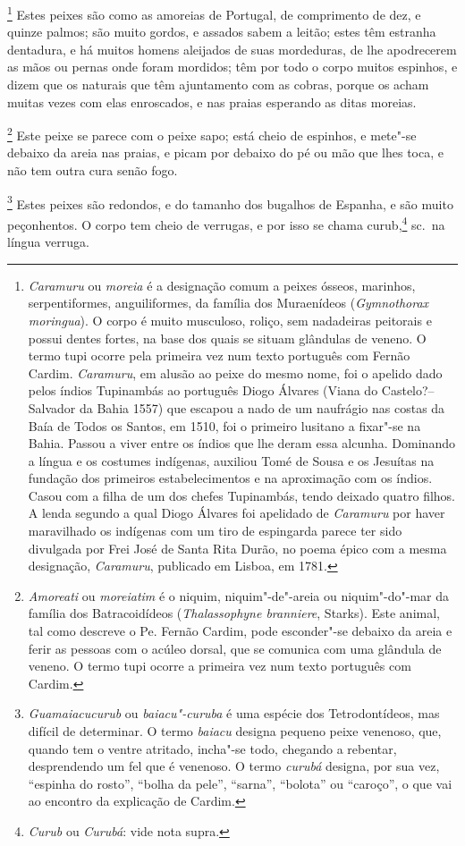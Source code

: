 \footnote{ \textit{Caramuru} ou \textit{moreia} é a
designação comum a peixes ósseos, marinhos, serpentiformes,
anguiliformes, da família dos Muraenídeos (\textit{Gymnothorax
moringua}). O corpo é muito musculoso, roliço, sem nadadeiras peitorais
e possui dentes fortes, na base dos quais se situam glândulas de
veneno. O termo tupi ocorre pela primeira vez num texto português com
Fernão Cardim. \textit{Caramuru}, em alusão ao peixe do mesmo nome, foi
o apelido dado pelos índios Tupinambás ao português Diogo Álvares (Viana
do Castelo?--Salvador da Bahia 1557) que escapou a nado de um
naufrágio nas costas da Baía de Todos os Santos, em 1510, foi o
primeiro lusitano a fixar"-se na Bahia. Passou a viver entre os índios
que lhe deram essa alcunha. Dominando a língua e os costumes indígenas,
auxiliou Tomé de Sousa e os Jesuítas na fundação dos primeiros
estabelecimentos e na aproximação com os índios. Casou com a filha de
um dos chefes Tupinambás, tendo deixado quatro filhos. A lenda segundo a
qual Diogo Álvares foi apelidado de \textit{Caramuru} por haver
maravilhado os indígenas com um tiro de espingarda parece ter sido
divulgada por Frei José de Santa Rita Durão, no poema épico com a mesma
designação, \textit{Caramuru}, publicado em Lisboa, em 1781.} 
Estes peixes são como as amoreias de Portugal, de comprimento de dez,
e quinze palmos; são muito gordos, e assados sabem a leitão; estes têm
estranha dentadura, e há muitos homens aleijados de suas mordeduras, de
lhe apodrecerem as mãos ou pernas onde foram mordidos; têm por todo o
corpo muitos espinhos, e dizem que os naturais que têm ajuntamento com
as cobras, porque os acham muitas vezes com elas enroscados, e nas
praias esperando as ditas moreias.

\footnote{ \textit{Amoreati} ou \textit{moreiatim} 
é o niquim, niquim"-de"-areia ou niquim"-do"-mar da família dos
Batracoidídeos (\textit{Thalassophyne branniere}, Starks). Este animal,
tal como descreve o Pe. Fernão Cardim, pode esconder"-se debaixo da
areia e ferir as pessoas com o acúleo dorsal, que se comunica com uma
glândula de veneno. O termo tupi ocorre a primeira vez num texto
português com Cardim.} Este peixe se parece com o peixe
sapo; está cheio de espinhos, e mete"-se debaixo da areia nas praias, e
picam por debaixo do pé ou mão que lhes toca, e não tem outra cura
senão fogo.

\footnote{ \textit{Guamaiacucurub} ou
\textit{baiacu"-curuba} é uma espécie dos Tetrodontídeos, mas difícil
de determinar. O termo \textit{baiacu} designa pequeno peixe venenoso,
que, quando tem o ventre atritado, incha"-se todo, chegando a rebentar,
desprendendo um fel que é venenoso. O termo \textit{curubá} designa,
por sua vez, ``espinha do rosto'', ``bolha da pele'', ``sarna'', ``bolota'' ou
``caroço'', o que vai ao encontro da explicação de Cardim.} 
Estes peixes são redondos, e do tamanho dos bugalhos de Espanha, e são
muito peçonhentos. O corpo tem cheio de verrugas, e por isso se chama
curub,\footnote{ \textit{Curub} ou \textit{Curubá}: vide nota supra.} 
sc.~na língua verruga.

